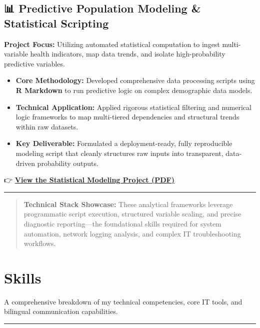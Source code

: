 \documentclass[
]{book}
\providecommand{\tightlist}{%
  \setlength{\itemsep}{0pt}\setlength{\parskip}{0pt}}
\begin{document}
\section*{📊 Predictive Population Modeling \& Statistical Scripting}\label{predictive-population-modeling-statistical-scripting}

\textbf{Project Focus:} Utilizing automated statistical computation to ingest multi-variable health indicators, map data trends, and isolate high-probability predictive variables.

\begin{itemize}
\tightlist
\item
  \textbf{Core Methodology:} Developed comprehensive data processing scripts using \textbf{R Markdown} to run predictive logic on complex demographic data models.
\item
  \textbf{Technical Application:} Applied rigorous statistical filtering and numerical logic frameworks to map multi-tiered dependencies and structural trends within raw datasets.
\item
  \textbf{Key Deliverable:} Formulated a deployment-ready, fully reproducible modeling script that cleanly structures raw inputs into transparent, data-driven probability outputs.
\end{itemize}

👉 \href{assets/FinalProject.pdf}{\textbf{View the Statistical Modeling Project (PDF)}}

\begin{center}\rule{0.5\linewidth}{0.5pt}\end{center}

\begin{quote}
\textbf{Technical Stack Showcase:} These analytical frameworks leverage programmatic script execution, structured variable scaling, and precise diagnostic reporting---the foundational skills required for system automation, network logging analysis, and complex IT troubleshooting workflows.
\end{quote}

\chapter{Skills}\label{skills}

A comprehensive breakdown of my technical competencies, core IT tools, and bilingual communication capabilities.

\begin{center}\rule{0.5\linewidth}{0.5pt}\end{center}
\end{document}
